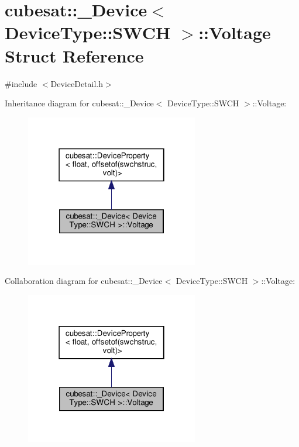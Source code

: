 \hypertarget{structcubesat_1_1__Device_3_01DeviceType_1_1SWCH_01_4_1_1Voltage}{}\section{cubesat\+:\+:\+\_\+\+Device$<$ Device\+Type\+:\+:S\+W\+CH $>$\+:\+:Voltage Struct Reference}
\label{structcubesat_1_1__Device_3_01DeviceType_1_1SWCH_01_4_1_1Voltage}


{\ttfamily \#include $<$Device\+Detail.\+h$>$}



Inheritance diagram for cubesat\+:\+:\+\_\+\+Device$<$ Device\+Type\+:\+:S\+W\+CH $>$\+:\+:Voltage\+:\nopagebreak
\begin{figure}[H]
\begin{center}
\leavevmode
\includegraphics[width=214pt]{structcubesat_1_1__Device_3_01DeviceType_1_1SWCH_01_4_1_1Voltage__inherit__graph}
\end{center}
\end{figure}


Collaboration diagram for cubesat\+:\+:\+\_\+\+Device$<$ Device\+Type\+:\+:S\+W\+CH $>$\+:\+:Voltage\+:\nopagebreak
\begin{figure}[H]
\begin{center}
\leavevmode
\includegraphics[width=214pt]{structcubesat_1_1__Device_3_01DeviceType_1_1SWCH_01_4_1_1Voltage__coll__graph}
\end{center}
\end{figure}
